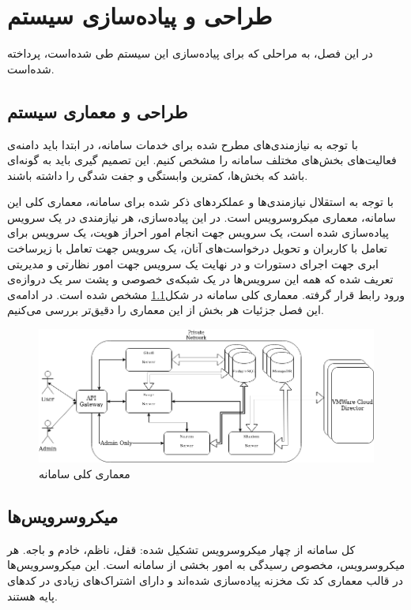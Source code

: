 \chapter{طراحی و پیاده‌سازی سیستم}
در این فصل، به مراحلی که برای پیاده‌سازی این سیستم طی شده‌است، پرداخته شده‌است.


\section{طراحی و معماری سیستم}
با توجه به نیازمندی‌های مطرح شده برای خدمات سامانه، در ابتدا باید دامنه‌ی فعالیت‌های بخش‌های مختلف سامانه را مشخص کنیم. این تصمیم گیری باید به گونه‌ای باشد که بخش‌ها، کمترین وابستگی و جفت شدگی را داشته باشند.

با توجه به استقلال نیازمندی‌ها و عملکرد‌های ذکر شده برای سامانه، معماری کلی این سامانه، معماری میکروسرویس است. در این پیاده‌سازی، هر نیازمندی در یک سرویس پیاده‌سازی شده است، یک سرویس جهت انجام امور احراز هویت، یک سرویس برای تعامل با کاربران و تحویل درخواست‌های آنان، یک سرویس جهت تعامل با زیرساخت ابری جهت اجرای دستورات و در نهایت یک سرویس جهت امور نظارتی و مدیریتی تعریف شده که همه این سرویس‌ها در یک شبکه‌ی خصوصی و پشت سر یک ‌دروازه‌ی ورود رابط قرار گرفته. معماری کلی سامانه در شکل\ref{fig:30bird-arch} مشخص شده است. در ادامه‌ی این فصل جزئیات هر بخش از این معماری را دقیق‌تر بررسی می‌کنیم.

\begin{figure}
	\centering
	\includegraphics[scale=0.5]{figures/30bird-arch.png}
	\caption{معماری کلی سامانه}
	\label{fig:30bird-arch}
\end{figure}

\section{میکروسرویس‌ها}
کل سامانه از چهار میکروسرویس تشکیل شده: قفل، ناظم، خادم و باجه. هر میکروسرویس، مخصوص رسیدگی به امور بخشی از سامانه است. این میکروسرویس‌ها در قالب معماری کد تک مخزنه پیاده‌سازی شده‌اند و دارای اشتراک‌های زیادی در کد‌های پایه هستند.

